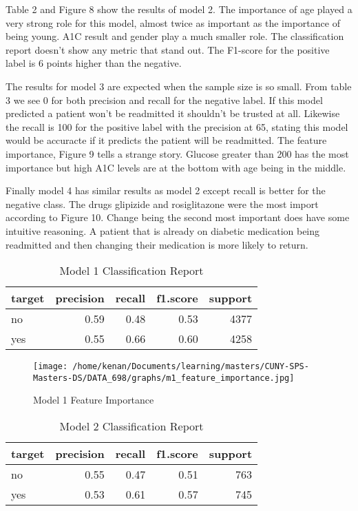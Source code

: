 \documentclass[5p]{elsarticle} %
\begin{document}
Table 2 and Figure 8 show the results of model 2. The importance of age
played a very strong role for this model, almost twice as important as
the importance of being young. A1C result and gender play a much smaller
role. The classification report doesn't show any metric that stand out.
The F1-score for the positive label is 6 points higher than the
negative.

The results for model 3 are expected when the sample size is so small.
From table 3 we see 0 for both precision and recall for the negative
label. If this model predicted a patient won't be readmitted it
shouldn't be trusted at all. Likewise the recall is 100 for the positive
label with the precision at 65, stating this model would be accuracte if
it predicts the patient will be readmitted. The feature importance,
Figure 9 tells a strange story. Glucose greater than 200 has the most
importance but high A1C levels are at the bottom with age being in the
middle.

Finally model 4 has similar results as model 2 except recall is better
for the negative class. The drugs glipizide and rosiglitazone were the
most import according to Figure 10. Change being the second most
important does have some intuitive reasoning. A patient that is already
on diabetic medication being readmitted and then changing their
medication is more likely to return.

\clearpage
\onecolumn

\begin{table}

\caption{\label{tab:unnamed-chunk-3}Model 1 Classification Report}
\centering
\begin{tabular}[t]{l|r|r|r|r}
\hline
target & precision & recall & f1.score & support\\
\hline
no & 0.59 & 0.48 & 0.53 & 4377\\
\hline
yes & 0.55 & 0.66 & 0.60 & 4258\\
\hline
\end{tabular}
\end{table}

\begin{figure}
\hypertarget{id}{%
\centering
\texttt{[image: /home/kenan/Documents/learning/masters/CUNY-SPS-Masters-DS/DATA\_698/graphs/m1\_feature\_importance.jpg]}
\caption{Model 1 Feature Importance}\label{id}
}
\end{figure}

\begin{table}

\caption{\label{tab:unnamed-chunk-4}Model 2 Classification Report}
\centering
\begin{tabular}[t]{l|r|r|r|r}
\hline
target & precision & recall & f1.score & support\\
\hline
no & 0.55 & 0.47 & 0.51 & 763\\
\hline
yes & 0.53 & 0.61 & 0.57 & 745\\
\hline
\end{tabular}
\end{table}
\end{document}
